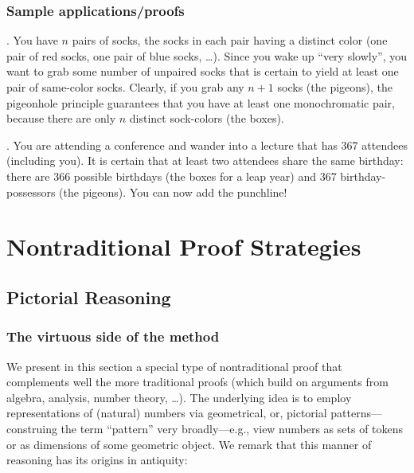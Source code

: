 \subsubsection{Sample applications/proofs}
\label{sec:pigeon-apps}

.
You have $n$ pairs of socks, the socks in each pair having a distinct color (one pair of red socks, one pair of blue socks, \ldots).  Since you wake up ``very slowly'', you want to grab some number of unpaired socks that is certain to yield at least one pair of same-color socks.  Clearly, if you grab any $n+1$ socks (the pigeons), the pigeonhole principle guarantees that you have at least one monochromatic pair, because there are only $n$ distinct sock-colors (the boxes).

\medskip

.
You are attending a conference and wander into a lecture that has 367 attendees (including you).  It is certain that at least two attendees share the same birthday: there are 366 possible birthdays (the boxes for a leap year) and 367 birthday-possessors (the pigeons).  You can now add the punchline!





\section{Nontraditional Proof Strategies}
\label{sec:nontraditionalProofs}

\subsection{Pictorial Reasoning}
\label{sec:graphicalproofs}

\subsubsection{The virtuous side of the method}

We present in this section a special type of nontraditional proof that complements well the more traditional proofs (which build on arguments from algebra, analysis, number theory, \ldots).  The underlying idea is to employ representations of (natural) numbers via geometrical, or, pictorial
patterns---construing the term ``pattern'' very broadly---e.g., view numbers as sets of tokens or as dimensions of some geometric object.  We remark that this manner of reasoning has its origins in antiquity:

